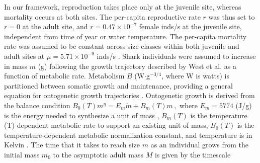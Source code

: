 \documentclass[]{rsos}%
\begin{document}
In our framework, reproduction takes place only at the juvenile site, whereas mortality occurs at both sites.
The per-capita reproductive rate $r$ was thus set to $r=0$ at the adult site, and $r = 0.47 \times 10^{-7}$ female inds/s \cite{cortes1996comparative} at the juvenile site, independent from time of year or water temperature. 
The per-capita mortality rate was assumed to be constant across size classes within both juvenile and adult sites at $\mu = 5.71 \times 10^{-9}$ inds/s \cite{schindler2002sharks}. 
Shark individuals were assumed to increase in mass $m$ (g) following the growth trajectory described by West et al. \cite{West:2001bv} as a function of metabolic rate.
Metabolism $B$ (W$\cdot$g${}^{-3/4}$, where W is watts) is partitioned between somatic growth and maintenance, providing a general equation for ontogenetic growth trajectories \cite{West:2001bv,moses2008rmo,gillooly2002esa,hou,Kempes:2012hy}. 
Ontogenetic growth is derived from the balance condition 
$B_{0}(T)m^{\eta}=E_{m}\dot{m}+B_{m}(T)m\,,$
where $E_{m} = 5774$ (J/g) is the energy needed to synthesize a unit of mass \cite{moses2008rmo,hou,Pirt1965,Heijnen1981}, $B_{m}(T)$ is the temperature (T)-dependent metabolic rate to support an existing unit of mass, $B_0(T)$ is the temperature-dependent metabolic normalization constant, and temperature is in Kelvin \cite{West:2001bv,moses2008rmo,gillooly2002esa,hou,Kempes:2012hy}.
The time that it takes to reach size $m$ as an individual grows from the initial mass $m_0$ to the asymptotic adult mass $M$ is given by the timescale
\end{document}
